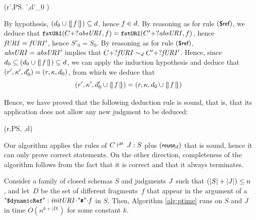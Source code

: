 \begin{appendixproof}
{%
 (r',\ps',d'_0 \cup {} )
}

By hypothesis, $(d_0 \cup \{\!|\,{\mathit{f}}\,|\!\})\subseteq d$, hence
$\mathit{f} \in d$. By reasoning as for rule $(\mbox{\sf{\small \$ref}})$,
we deduce that
$ \mbox{\tt{\small fstURI}}(C+?\mathit{absURI},f)= \mbox{\tt{\small fstURI}}(C'+?\mathit{absURI},f)$,
hence $\mathit{fURI}=\mathit{fURI'}$,
hence $S'_0=S_0$.
By reasoning as for rule $(\mbox{\sf{\small \$ref}})$, $\mathit{absURI}=\mathit{absURI'}$
implies that ${C  +? \mathit{fURI}}\sim_{d}{C'  +? \mathit{fURI'}}$.
Hence, since $d_0 \subseteq (d_0 \cup \{\!|\,{\mathit{f}}\,|\!\} ) \subseteq d$, we can apply the induction hypothesis
and deduce that $(r',\kappa',d'_0)=(r,\kappa,d_0)$, from which we deduce
that 
$$
(r',\kappa',d'_0 \cup \{\!|\,{\mathit{f}}\,|\!\} ) =  (r,\kappa,d_0 \cup \{\!|\,{\mathit{f}}\,|\!\} )
$$

Hence, we have proved that the following deduction rule is sound, that is, that its application does not allow
any new judgment to be deduced:

{%
 (r,\ps,d)
}

Our algorithm applies the rules of $\SdJudg{C}{J}{S}$ plus $(\mbox{\sf{\small reuse}}_d)$ that is sound, hence it can only
prove correct statements. 
On the other direction, completeness of the algorithm follows from the fact that it is correct and that it always terminates.
\end{appendixproof}

%

\begin{theoremrep}\label{the:ptime}
Consider a family of closed schemas $S$ and judgments ${J}$ such that
$(|S|+|{J}|) \leq n$, and let~$D$ be the set of different fragments~$f$ that appear in the argument 
of a $\qddref: \key{initURI}\catHash\key{f}$ in $S$.
Then, Algorithm \ref{alg:ptime} runs on $S$ and $J$ in time $O(n^{k+|D|})$ for some constant $k$.
\end{theoremrep}

